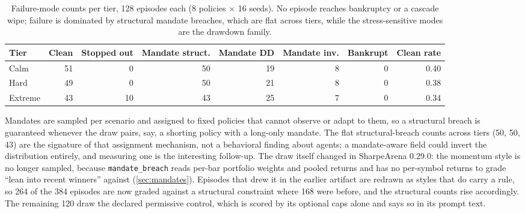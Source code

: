 \begin{table}[t]
\centering
\caption{Failure-mode counts per tier, 128 episodes each (8 policies $\times$ 16 seeds). No episode reaches bankruptcy or a cascade wipe; failure is dominated by structural mandate breaches, which are flat across tiers, while the stress-sensitive modes are the drawdown family.}
\label{tab:f7}
\small
\setlength{\tabcolsep}{5pt}
\begin{tabular}{lrrrrrrr}
\toprule
Tier & Clean & Stopped out & Mandate struct. & Mandate DD & Mandate inv. & Bankrupt & Clean rate \\
\midrule
Calm & 51 & 0 & 50 & 19 & 8 & 0 & 0.40 \\
Hard & 49 & 0 & 50 & 21 & 8 & 0 & 0.38 \\
Extreme & 43 & 10 & 43 & 25 & 7 & 0 & 0.34 \\
\bottomrule
\end{tabular}
\end{table}

Mandates are sampled per scenario and assigned to fixed policies that cannot observe or adapt to them, so a structural breach is guaranteed whenever the draw pairs, say, a shorting policy with a long-only mandate. The flat structural-breach counts across tiers (50, 50, 43) are the signature of that assignment mechanism, not a behavioral finding about agents; a mandate-aware field could invert the distribution entirely, and measuring one is the interesting follow-up. The draw itself changed in SharpeArena 0.29.0: the momentum style is no longer sampled, because \texttt{mandate\_breach} reads per-bar portfolio weights and pooled returns and has no per-symbol returns to grade ``lean into recent winners'' against (\cref{sec:mandates}). Episodes that drew it in the earlier artifact are redrawn as styles that do carry a rule, so 264 of the 384 episodes are now graded against a structural constraint where 168 were before, and the structural counts rise accordingly. The remaining 120 draw the declared permissive control, which is scored by its optional caps alone and says so in its prompt text.

